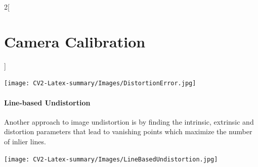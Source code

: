 \documentclass[oneside,fontsize=11pt,paper=a4]{scrartcl}
\newenvironment{myfigure}
  {\par\medskip\noindent\minipage{\linewidth}}
  {\endminipage\par\medskip}
\begin{document}
\begin{multicols}{2}[\section{Camera Calibration}]
\begin{myfigure}
    \texttt{[image: CV2-Latex-summary/Images/DistortionError.jpg]}
\end{myfigure}

\paragraph{Line-based Undistortion} Another approach to image undistortion is by finding the intrinsic, extrinsic and distortion parameters that lead to vanishing points which maximize the number of inlier lines.

\begin{myfigure}
    \texttt{[image: CV2-Latex-summary/Images/LineBasedUndistortion.jpg]}
\end{myfigure}

\end{multicols}
\newpage

\end{document}
